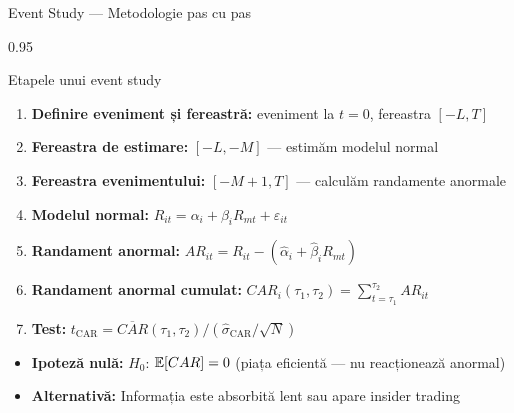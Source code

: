 \documentclass[9pt, aspectratio=169, t]{beamer}
\begin{document}
\begin{frame}{Event Study --- Metodologie pas cu pas}
    \begin{cminipage}{0.95\textwidth}
\small
\begin{block}{Etapele unui event study}
\begin{enumerate}\setlength{\itemsep}{0pt}
    \item \textbf{Definire eveniment și fereastră:} eveniment la $t=0$, fereastra $[-L, T]$
    \item \textbf{Fereastra de estimare:} $[-L, -M]$ --- estimăm modelul normal
    \item \textbf{Fereastra evenimentului:} $[-M+1, T]$ --- calculăm randamente anormale
    \item \textbf{Modelul normal:} $R_{it} = \alpha_i + \beta_i R_{mt} + \varepsilon_{it}$
    \item \textbf{Randament anormal:}
$AR_{it} = R_{it} - (\hat\alpha_i + \hat\beta_i R_{mt})$
    \item \textbf{Randament anormal cumulat:}
$CAR_i(\tau_1, \tau_2) = \sum_{t=\tau_1}^{\tau_2} AR_{it}$
    \item \textbf{Test:}
$t_{\text{CAR}} = \overline{CAR}(\tau_1, \tau_2) / (\hat\sigma_{\text{CAR}} / \sqrt{N})$
\end{enumerate}
\end{block}

\begin{itemize}\setlength{\itemsep}{0pt}
    \item \textbf{Ipoteză nulă:} $H_0$: $\mathbb{E}[CAR] = 0$ (piața eficientă --- nu reacționează anormal)
    \item \textbf{Alternativă:} Informația este absorbită lent sau apare insider trading
\end{itemize}
    \end{cminipage}
\end{frame}
\end{document}
